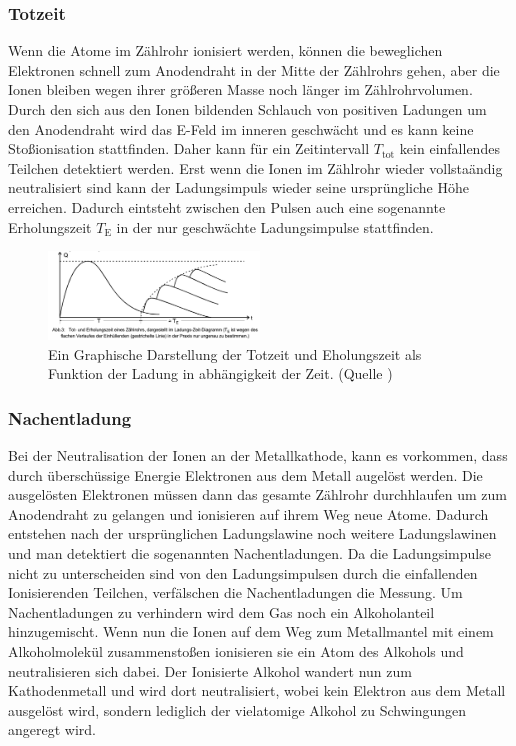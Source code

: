 \subsubsection{Totzeit}
Wenn die Atome im Zählrohr ionisiert werden, können die beweglichen Elektronen schnell zum Anodendraht in der Mitte der Zählrohrs gehen, aber die Ionen bleiben wegen ihrer größeren Masse noch länger im Zählrohrvolumen.
Durch den sich aus den Ionen bildenden Schlauch von positiven Ladungen um den Anodendraht wird das E-Feld im inneren geschwächt und es kann keine Stoßionisation stattfinden.
Daher kann für ein Zeitintervall $T_{\text{tot}}$ kein einfallendes Teilchen detektiert werden.
Erst wenn die Ionen im Zählrohr wieder vollstaändig neutralisiert sind kann der Ladungsimpuls wieder seine ursprüngliche Höhe erreichen.
Dadurch eintsteht zwischen den Pulsen auch eine sogenannte Erholungszeit $T_{\text{E}}$ in der nur geschwächte Ladungsimpulse stattfinden.
\begin{figure}
    \centering
    \includegraphics[width=0.5\textwidth]{bilder/Totzeit_Erholungszeit.png}
    \caption{Ein Graphische Darstellung der Totzeit und Eholungszeit als Funktion der Ladung in abhängigkeit der Zeit. (Quelle \cite{Anleitung})}
    \label{fig:Totzeit_Erholungszeit}
\end{figure}
\subsubsection{Nachentladung}
\label{sec:Nachentladung}
Bei der Neutralisation der Ionen an der Metallkathode, kann es vorkommen, dass durch überschüssige Energie Elektronen aus dem Metall augelöst werden.
Die ausgelösten Elektronen müssen dann das gesamte Zählrohr durchhlaufen um zum Anodendraht zu gelangen und ionisieren auf ihrem Weg neue Atome.
Dadurch entstehen nach der ursprünglichen Ladungslawine noch weitere Ladungslawinen und man detektiert die sogenannten Nachentladungen.
Da die Ladungsimpulse nicht zu unterscheiden sind von den Ladungsimpulsen durch die einfallenden Ionisierenden Teilchen, verfälschen die Nachentladungen die Messung.
Um Nachentladungen zu verhindern wird dem Gas noch ein Alkoholanteil hinzugemischt.
Wenn nun die Ionen auf dem Weg zum Metallmantel mit einem Alkoholmolekül zusammenstoßen ionisieren sie ein Atom des Alkohols und neutralisieren sich dabei.
Der Ionisierte Alkohol wandert nun zum Kathodenmetall und wird dort neutralisiert, wobei kein Elektron aus dem Metall ausgelöst wird, sondern lediglich der vielatomige Alkohol zu Schwingungen angeregt wird.

